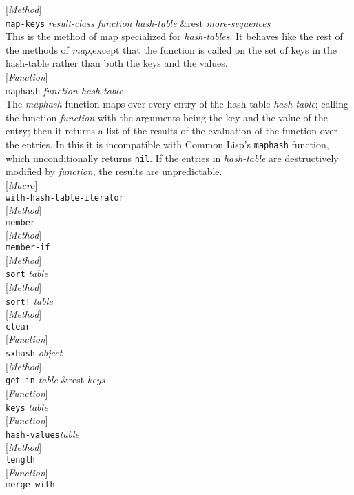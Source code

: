 \documentclass[10pt]{book}
\newenvironment{defother}[2]{[\textit{#1}]\\\texttt{#2}}{\\}
\newenvironment{defun}[1]{\begin{defother}{Function}{#1}}{\end{defother}}
\newenvironment{defmethod}[1]{\begin{defother}{Method}{#1}}{\end{defother}}
\newenvironment{defmacro}[1]{\begin{defother}{Macro}{#1}}{\end{defother}}
\begin{document}
\begin{defmethod}{map-keys} \textit{result-class} \textit{function} \textit{hash-table} \&rest \textit{more-sequences}\\ %
This is the method of map specialized for \textit{hash-tables}. It behaves like the rest of the methods of \textit{map},except that the function is called on the set of keys in the hash-table rather than both the keys and the values.\end{defmethod}
\begin{defun}{maphash} \textit{function hash-table}\\
The \textit{maphash} function maps over every entry of the hash-table \textit{hash-table}; calling the function \textit{function} with the arguments being the key and the value of the entry; then it returns a list of the results of the evaluation of the function over the entries. In this it is incompatible with {\sc Common Lisp}'s \texttt{maphash} function, which unconditionally returns \texttt{nil}. If the entries in \textit{hash-table} are destructively modified by \textit{function}, the results are unpredictable.  \end{defun}
\begin{defmacro}{with-hash-table-iterator}\end{defmacro}
\begin{defmethod}{member}\end{defmethod}
\begin{defmethod}{member-if}\end{defmethod}
\begin{defmethod}{sort} \textit{table}\end{defmethod}
\begin{defmethod}{sort!} \textit{table}\end{defmethod}
\begin{defmethod}{clear}\end{defmethod}
\begin{defun}{sxhash} \textit{object}\end{defun}
\begin{defmethod}{get-in} \textit{table} \&rest \textit{keys}\end{defmethod}
\begin{defun}{keys} \textit{table}\end{defun}%
\begin{defun}{hash-values}\textit{table}\end{defun}
\begin{defmethod}{length}\end{defmethod}
\begin{defun}{merge-with}\end{defun}
\end{document}
